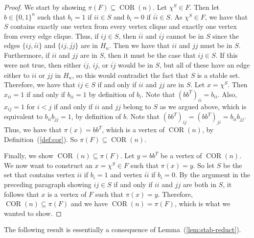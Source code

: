 \documentclass{article}
\theoremstyle{definition}
\theoremstyle{remark}
\newcommand{\bits}{\{0,1\}}
\newcommand{\ol}[1]{\overline{#1}}
\newcommand{\ul}[1]{\underline{#1}}
\newcommand{\oul}[1]{\overline{\underline{#1}}}
\newcommand{\COR}{\operatorname{COR}}
\begin{document}
\begin{proof}
We start by showing $\pi(F) \subseteq \COR(n)$. Let $\chi^S \in F$. Then let $b \in \bits^n$ such that $b_i = 1$ if $ii \in S$ and $b_i = 0$ if $\ol{ii} \in S$. As $\chi^S \in F$, we have that $S$ contains exactly one vertex from every vertex clique and exactly one vertex from every edge clique. Thus, if $ij \in S$, then $\ol{ii}$ and $\ol{ij}$ cannot be in $S$ since the edges $\{ij, \ol{ii}\}$ and $\{ij, \ol{jj}\}$ are in $H_n$. Then we have that $ii$ and $jj$ must be in $S$. Furthermore, if $ii$ and $jj$ are in $S$, then it must be the case that $ij \in S$. If this were not true, then either $\ol{ij}$, $\ul{ij}$, or $\oul{ij}$ would be in $S$, but all of these have an edge either to $ii$ or $jj$ in $H_n$, so this would contradict the fact that $S$ is a stable set. Therefore, we have that $ij \in S$ if and only if $ii$ and $jj$ are in $S$. Let $x = \chi^S$. Then $x_{ii} = 1$ if and only if $b_{ii} = 1$ by definition of $b_i$. Note that $(bb^T)_{ii} = b_{ii}$. Also, $x_{ij} = 1$ for $i < j$ if and only if $ii$ and $jj$ belong to $S$ as we argued above, which is equivalent to $b_{ii}b_{jj} =1$, by definition of $b$. Note that $(bb^T)_{ij} = (bb^T)_{ji} = b_{ii}b_{jj}$. Thus, we have that $\pi(x) = bb^T$, which is a vertex of $\COR(n)$, by Definition~(\ref{def:cor}). So $\pi(F) \subseteq \COR(n)$.

Finally, we show $\COR(n) \subseteq \pi(F)$. Let $y = bb^T$ be a vertex of $\COR(n)$. We now want to construct an $x = \chi^S \in F$ such that $\pi(x) = y$. So let $S$ be the set that contains vertex $ii$ if $b_i = 1$ and vertex $\ol{ii}$ if $b_i = 0$. By the argument in the preceding paragraph showing $ij \in S$ if and only if $ii$ and $jj$ are both in $S$, it follows that $x$ is a vertex of $F$ such that $\pi(x) = y$. Therefore, $\COR(n) \subseteq \pi(F)$ and we have $\COR(n) = \pi(F)$, which is what we wanted to show.
\end{proof}

The following result is essentially a consequence of Lemma~(\ref{lem:stab-reduct}).
\end{document}
